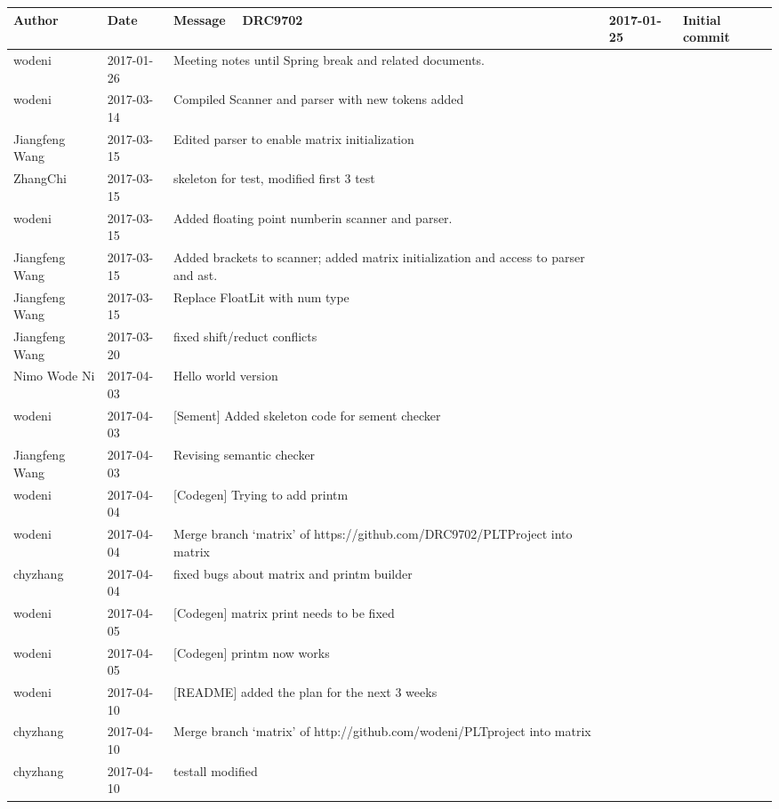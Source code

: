 \begin{center}
\begin{longtabu} to \textwidth {|
    X[4,l]|
    X[3,c]|
    X[8,l]|}
    \hline
    \textbf{Author} & \textbf{Date} & \textbf{Message} \ \hline
DRC9702 & 2017-01-25 & Initial commit \\ \hline
wodeni & 2017-01-26 & Meeting notes until Spring break and related documents. \\ \hline
wodeni & 2017-03-14 & Compiled Scanner and parser with new tokens added \\ \hline
Jiangfeng Wang & 2017-03-15 & Edited parser to enable matrix initialization \\ \hline
ZhangChi & 2017-03-15 & skeleton for test, modified first 3 test \\ \hline
wodeni & 2017-03-15 & Added floating point numberin scanner and parser. \\ \hline
Jiangfeng Wang & 2017-03-15 & Added brackets to scanner; added matrix initialization and access to parser and ast. \\ \hline
Jiangfeng Wang & 2017-03-15 & Replace FloatLit with num type \\ \hline
Jiangfeng Wang & 2017-03-20 & fixed shift/reduct conflicts \\ \hline
Nimo Wode Ni & 2017-04-03 & Hello world version \\ \hline
wodeni & 2017-04-03 & {[}Sement{]} Added skeleton code for sement checker \\ \hline
Jiangfeng Wang & 2017-04-03 & Revising semantic checker \\ \hline
wodeni & 2017-04-04 & {[}Codegen{]} Trying to add printm \\ \hline
wodeni & 2017-04-04 & Merge branch `matrix' of https://github.com/DRC9702/PLTProject into matrix \\ \hline
chyzhang & 2017-04-04 & fixed bugs about matrix and printm builder \\ \hline
wodeni & 2017-04-05 & {[}Codegen{]} matrix print needs to be fixed \\ \hline
wodeni & 2017-04-05 & {[}Codegen{]} printm now works \\ \hline
wodeni & 2017-04-10 & {[}README{]} added the plan for the next 3 weeks \\ \hline
chyzhang & 2017-04-10 & Merge branch `matrix' of http://github.com/wodeni/PLTproject into matrix \\ \hline
chyzhang & 2017-04-10 & testall modified \\ \hline

\end{longtabu}
\end{center}
